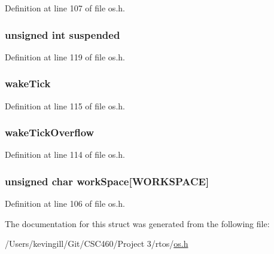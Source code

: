 Definition at line 107 of file os.\+h.

\subsubsection[{\texorpdfstring{suspended}{suspended}}]{\setlength{\rightskip}{0pt plus 5cm}unsigned int suspended}\hypertarget{struct_process_descriptor_a2862ffde11c780129862e5549415a6f6}{}\label{struct_process_descriptor_a2862ffde11c780129862e5549415a6f6}


Definition at line 119 of file os.\+h.

\subsubsection[{\texorpdfstring{wake\+Tick}{wakeTick}}]{ wake\+Tick}\hypertarget{struct_process_descriptor_ad3dc3420729bd1d10e0aaa2bd7b06da8}{}\label{struct_process_descriptor_ad3dc3420729bd1d10e0aaa2bd7b06da8}


Definition at line 115 of file os.\+h.

\subsubsection[{\texorpdfstring{wake\+Tick\+Overflow}{wakeTickOverflow}}]{ wake\+Tick\+Overflow}\hypertarget{struct_process_descriptor_ab542ea7817e429d975a24a2c5b7d39c6}{}\label{struct_process_descriptor_ab542ea7817e429d975a24a2c5b7d39c6}


Definition at line 114 of file os.\+h.

\subsubsection[{\texorpdfstring{work\+Space}{workSpace}}]{\setlength{\rightskip}{0pt plus 5cm}unsigned char work\+Space\mbox{[}{\bf W\+O\+R\+K\+S\+P\+A\+CE}\mbox{]}}\hypertarget{struct_process_descriptor_ad45e5fb3f0fb598c044bcca7df695216}{}\label{struct_process_descriptor_ad45e5fb3f0fb598c044bcca7df695216}


Definition at line 106 of file os.\+h.



The documentation for this struct was generated from the following file\+:\begin{DoxyCompactItemize}
\item 
/\+Users/kevingill/\+Git/\+C\+S\+C460/\+Project 3/rtos/\hyperlink{os_8h}{os.\+h}\end{DoxyCompactItemize}
